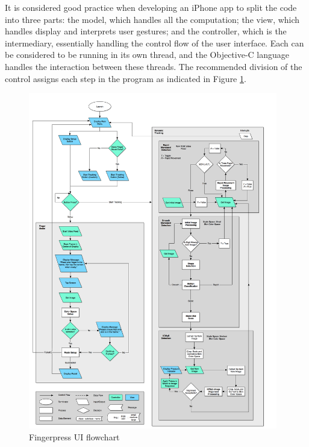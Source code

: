 It is considered good practice when developing an iPhone app to split the code into three parts: the model, which handles all the computation; the view, which handles display and interprets user gestures; and the controller, which is the intermediary, essentially handling the control flow of the user interface. Each can be considered to be running in its own thread, and the Objective-C language handles the interaction between these threads. The recommended division of the control assigns each step in the program as indicated in Figure \ref{fig:FingerpressUI}. 

\begin{figure}[h!]
  \centering
    \includegraphics[width=0.97\textwidth]{Chapter4/Figs/Fingerpress_UI.jpg}
    \caption{Fingerpress UI flowchart}\label{fig:FingerpressUI}
\end{figure}

